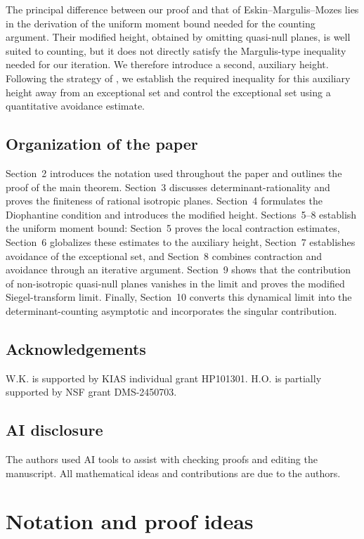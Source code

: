 \documentclass[reqno,11pt]{amsart}
\theoremstyle{definition}
\theoremstyle{remark}
\numberwithin{equation}{section}
\begin{document}
The principal difference between our proof and that of
Eskin--Margulis--Mozes lies in the derivation of the uniform moment bound
needed for the counting argument. Their modified height, obtained by
omitting quasi-null planes, is well suited to counting, but it does not
directly satisfy the Margulis-type inequality needed for our iteration.
We therefore introduce a second, auxiliary height. Following the strategy
of \cite{Kim}, we establish the required inequality for this auxiliary
height away from an exceptional set and control the exceptional set using
a quantitative avoidance estimate.



\subsection*{Organization of the paper}
Section~2 introduces the notation used throughout the paper and outlines the
proof of the main theorem. Section~3 discusses determinant-rationality and
proves the finiteness of rational isotropic planes. Section~4 formulates the
Diophantine condition and introduces the modified height. Sections~5--8
establish the uniform moment bound: Section~5 proves the local contraction
estimates, Section~6 globalizes these estimates to the auxiliary height,
Section~7 establishes avoidance of the exceptional set, and Section~8
combines contraction and avoidance through an iterative argument. Section~9
shows that the contribution of non-isotropic quasi-null planes vanishes in
the limit and proves the modified Siegel-transform limit. Finally,
Section~10 converts this dynamical limit into the determinant-counting
asymptotic and incorporates the singular contribution.




\subsection*{Acknowledgements}
W.K. is supported
by KIAS individual grant HP101301. H.O. is partially supported by NSF grant DMS-2450703. 



\subsection*{AI disclosure}
The authors used AI tools to assist with checking proofs  and editing the manuscript. All mathematical ideas and contributions are due to the authors.
\section{Notation and proof ideas}
\end{document}
